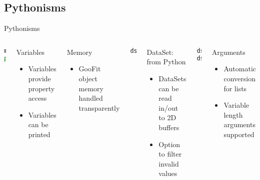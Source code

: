\documentclass[aspectratio=169, smaller]{beamer}
\begin{document}
\subsection{Pythonisms}
\begin{frame}[fragile]{Pythonisms}
    \begin{columns}[c]
        \begin{lstlisting}[language=Python]
mu.value = 2
print(mu)
        \end{lstlisting}
        \begin{block}{Variables}
            \begin{itemize}
                \item Variables provide property access
                \item Variables can be printed
            \end{itemize}
        \end{block}
        \begin{block}{Memory}
            \begin{itemize}
                \item GooFit object memory handled transparently
            \end{itemize}
        \end{block}
        \begin{lstlisting}[language=Python]
ds.from_matrix(numpydata, filter=True)
        \end{lstlisting}
        \begin{block}{DataSet: from Python}
            \begin{itemize}
                \item DataSets can be read in/out to 2D buffers
                \item Option to filter invalid values
            \end{itemize}
        \end{block}
        \begin{lstlisting}[language=Python]
ds = BinnedDataSet(x, y, z)
ds.addEvent(xval, yval, zval)
        \end{lstlisting}
        \begin{block}{Arguments}
            \begin{itemize}
                \item Automatic conversion for lists
                \item Variable length arguments supported
            \end{itemize}
        \end{block}
    \end{columns}
\end{frame}
\end{document}
